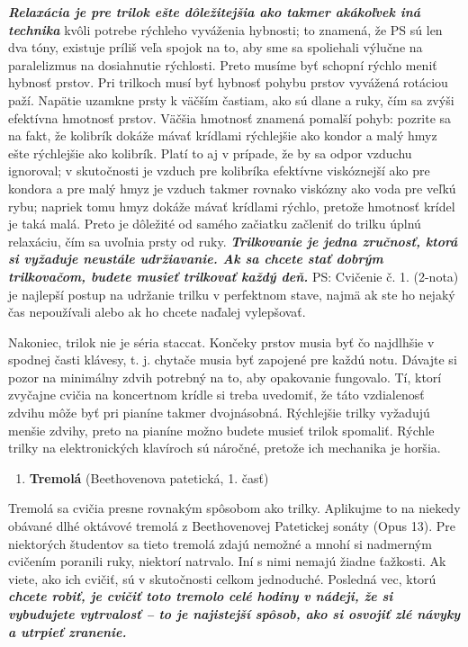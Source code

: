 \documentclass[11pt,a4paper%
]{book}
\begin{document}
\emph{\textbf{Relaxácia je pre trilok ešte dôležitejšia ako takmer akákoľvek iná technika}} kvôli potrebe rýchleho vyváženia hybnosti; to znamená, že PS sú len dva tóny, existuje príliš veľa spojok na to, aby sme sa spoliehali výlučne na paralelizmus na dosiahnutie rýchlosti. Preto musíme byť schopní rýchlo meniť hybnosť prstov. Pri trilkoch musí byť hybnosť pohybu prstov vyvážená rotáciou paží. Napätie uzamkne prsty k väčším častiam, ako sú dlane a ruky, čím sa zvýši efektívna hmotnosť prstov. Väčšia hmotnosť znamená pomalší pohyb: pozrite sa na fakt, že kolibrík dokáže mávať krídlami rýchlejšie ako kondor a malý hmyz ešte rýchlejšie ako kolibrík. Platí to aj v prípade, že by sa odpor vzduchu ignoroval; v skutočnosti je vzduch pre kolibríka efektívne viskóznejší ako pre kondora a pre malý hmyz je vzduch takmer rovnako viskózny ako voda pre veľkú rybu; napriek tomu hmyz dokáže mávať krídlami rýchlo, pretože hmotnosť krídel je taká malá. Preto je dôležité od samého začiatku začleniť do trilku úplnú relaxáciu, čím sa uvoľnia prsty od ruky. \emph{\textbf{Trilkovanie je jedna zručnosť, ktorá si vyžaduje neustále udržiavanie. Ak sa chcete stať dobrým trilkovačom, budete musieť trilkovať každý deň.}} PS: Cvičenie č. 1. (2-nota) je najlepší postup na udržanie trilku v perfektnom stave, najmä ak ste ho nejaký čas nepoužívali alebo ak ho chcete naďalej vylepšovať.

Nakoniec, trilok nie je séria staccat. Končeky prstov musia byť čo najdlhšie v spodnej časti klávesy, t. j. chytače musia byť zapojené pre každú notu. Dávajte si pozor na minimálny zdvih potrebný na to, aby opakovanie fungovalo. Tí, ktorí zvyčajne cvičia na koncertnom krídle si treba uvedomiť, že táto vzdialenosť zdvihu môže byť pri pianíne takmer dvojnásobná. Rýchlejšie trilky vyžadujú menšie zdvihy, preto na pianíne možno budete musieť trilok spomaliť. Rýchle trilky na elektronických klavíroch sú náročné, pretože ich mechanika je horšia.

\begin{enumerate}
\def\labelenumi{\alph{enumi}.}
\setcounter{enumi}{1}
\item
  \textbf{Tremolá} (Beethovenova patetická, 1. časť)
\end{enumerate}

Tremolá sa cvičia presne rovnakým spôsobom ako trilky. Aplikujme to na niekedy obávané dlhé oktávové tremolá z Beethovenovej Patetickej sonáty (Opus 13). Pre niektorých študentov sa tieto tremolá zdajú nemožné a mnohí si nadmerným cvičením poranili ruky, niektorí natrvalo. Iní s nimi nemajú žiadne ťažkosti. Ak viete, ako ich cvičiť, sú v skutočnosti celkom jednoduché. Posledná vec, ktorú \emph{\textbf{chcete robiť, je cvičiť toto tremolo celé hodiny v nádeji, že si vybudujete vytrvalosť -- to je najistejší spôsob, ako si osvojiť zlé návyky a utrpieť zranenie.}}
\end{document}
